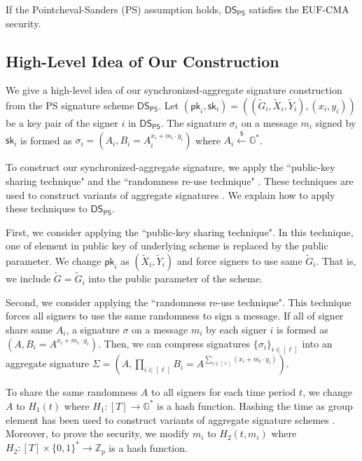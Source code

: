 \documentclass[a4paper,11pt]{fullverllncs}
\newcommand{\G}{\mathbb{G}}
\newcommand{\DS}{\mathsf{DS}}
\newcommand{\sk}{\mathsf{sk}}
\newcommand{\pk}{\mathsf{pk}}
\newcommand{\rmEUFCMA}{\mathrm{EUF}\mathchar`-\mathrm{CMA}}
\newcommand{\PS}{\mathsf{PS}}
\begin{document}
\begin{theorem}[\cite{PS16}]\label{PSfromPSassumption}
If the Pointcheval-Sanders (PS) assumption holds, $\DS_{\PS}$ satisfies the $\rmEUFCMA$ security.
\end{theorem}


\subsection{High-Level Idea of Our Construction}
We give a high-level idea of our synchronized-aggregate signature construction from the PS signature scheme $\DS_{\PS}$.
Let $(\pk_i, \sk_i) = ((\widetilde{G}_i, \widetilde{X}_i, \widetilde{Y}_i), \allowbreak (x_i, y_i))$ be a key pair of the signer $i$ in $\DS_{\PS}$.
The signature $\sigma_i$ on a message $m_i$ signed by $\sk_i$ is formed as $\sigma_i = (A_i, B_i = A_i^{x_i + m_i \cdot y_i})$ where $A_i \xleftarrow{\$} \G^*$.

To construct our synchronized-aggregate signature, we apply the ``public-key sharing technique" and the ``randomness re-use technique" \cite{LOSSW06}.
These techniques are used to construct variants of aggregate signatures \cite{LOSSW06,Sch11,LLY13,CK20,TT20}. 
We explain how to apply these techniques to $\DS_{\PS}$.

First, we consider applying the ``public-key sharing technique".
In this technique, one of element in public key of underlying scheme is replaced by the public parameter.
We change $\pk_i$ as $(\widetilde{X}_i, \widetilde{Y}_i)$ and force signers to use same $\widetilde{G}_i$.
That is, we include $\widetilde{G} = \widetilde{G}_i$ into the public parameter of the scheme.

Second, we consider applying the ``randomness re-use technique".
This technique forces all signers to use the same randomness to sign a message.
If all of signer share same $A_i$, a signature $\sigma$ on a message $m_i$ by each signer $i$ is formed as $(A, B_i = A^{x_i + m_i \cdot y_i})$.
Then, we can compress signatures $\{\sigma_i\}_{i \in [\ell]}$ into an aggregate signature $\Sigma = (A, \prod_{i \in [\ell]} B_i = A^{\sum_{i \in [\ell]} {(x_i + m_i \cdot y_i)}})$.


To share the same randomness $A$ to all signers for each time period $t$, we change $A$ to $H_1(t)$ where $H_1: [T] \rightarrow \G^*$ is a hash function.
Hashing the time as group element has been used to construct variants of aggregate signature schemes \cite{LLY13,LEOM15}.
Moreover, to prove the security, we modify $m_i$ to $H_2(t, m_i)$ where $H_2: [T] \times \{0, 1\}^* \rightarrow \mathbb{Z}_p$ is a hash function. 
\end{document}
